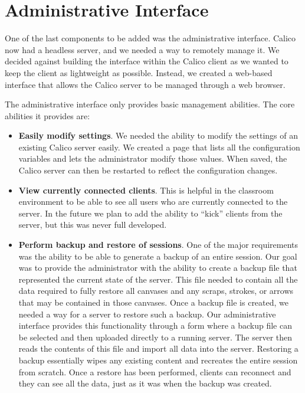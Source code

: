 \section{Administrative Interface}
One of the last components to be added was the administrative interface. Calico now had a headless server, and we needed a way to remotely manage it. We decided against building the interface within the Calico client as we wanted to keep the client as lightweight as possible. 
Instead, we created a web-based interface that allows the Calico server to be managed through a web browser.

The administrative interface only provides basic management abilities. The core abilities it provides are:
\begin{itemize}\itemsep1pt

\item
\textbf{Easily modify settings}.
We needed the ability to modify the settings of an existing Calico server easily. We created a page that lists all the configuration variables and lets the administrator modify those values. When saved, the Calico server can then be restarted to reflect the configuration changes.

\item
\textbf{View currently connected clients}. 
This is helpful in the classroom environment to be able to see all users who are currently connected to the server. In the future we plan to add the ability to ``kick'' clients from the server, but this was never full developed.

\item
\textbf{Perform backup and restore of sessions}.
One of the major requirements was the ability to be able to generate a backup of an entire session. Our goal was to provide the administrator with the ability to create a backup file that represented the current state of the server. This file needed to contain all the data required to fully restore all canvases and any scraps, strokes, or arrows that may be contained in those canvases. Once a backup file is created, we needed a way for a server to restore such a backup. Our administrative interface provides this functionality through a form where a backup file can be selected and then uploaded directly to a running server. The server then reads the contents of this file and import all data into the server. Restoring a backup essentially wipes any existing content and recreates the entire session from scratch. Once a restore has been performed, clients can reconnect and they can see all the data, just as it was when the backup was created.

\end{itemize}

